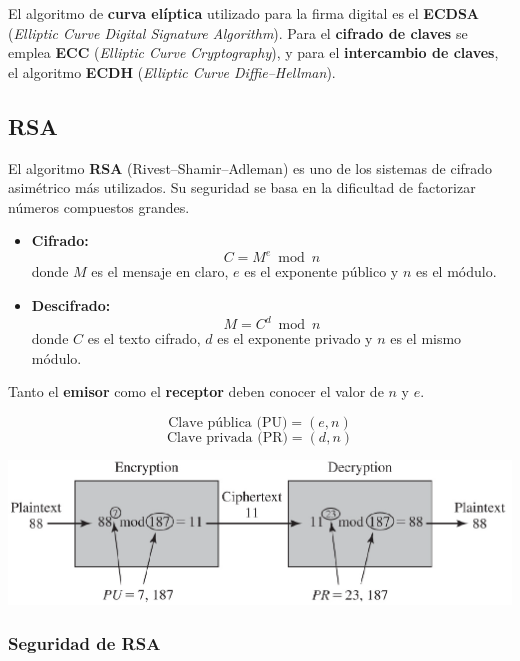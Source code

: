 \documentclass[11pt,a4paper]{article}
\begin{document}
\begin{NotaBox}
El algoritmo de \textbf{curva elíptica} utilizado para la firma digital es el \textbf{ECDSA} (\emph{Elliptic Curve Digital Signature Algorithm}).
Para el \textbf{cifrado de claves} se emplea \textbf{ECC} (\emph{Elliptic Curve Cryptography}), y para el \textbf{intercambio de claves}, el algoritmo \textbf{ECDH} (\emph{Elliptic Curve Diffie--Hellman}).
\end{NotaBox}


\subsection{RSA}

El algoritmo \textbf{RSA} (Rivest–Shamir–Adleman) es uno de los sistemas de cifrado asimétrico más utilizados.
Su seguridad se basa en la dificultad de factorizar números compuestos grandes.

\begin{itemize}
    \item \textbf{Cifrado:}
    \[
    C = M^e \bmod n
    \]
    donde \( M \) es el mensaje en claro, \( e \) es el exponente público y \( n \) es el módulo.

    \item \textbf{Descifrado:}
    \[
    M = C^d \bmod n
    \]
    donde \( C \) es el texto cifrado, \( d \) es el exponente privado y \( n \) es el mismo módulo.
\end{itemize}

Tanto el \textbf{emisor} como el \textbf{receptor} deben conocer el valor de \( n \) y \( e \).

\[
\text{Clave pública (PU)} = (e, n)
\]
\[
\text{Clave privada (PR)} = (d, n)
\]

\begin{center}
    \includegraphics[width=1\textwidth]{resources/RSA_Encryption_Decryption.png}
\end{center}

\subsubsection*{Seguridad de RSA}
\end{document}
